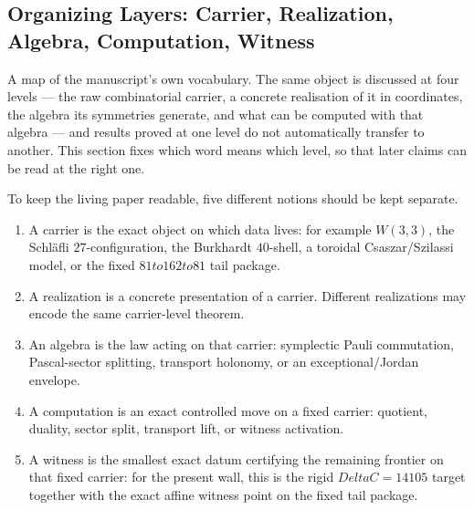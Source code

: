 \documentclass[12pt,a4paper]{article}
\def\textbf#1{#1}%
\def\Delta{Delta}%
\def\to{ to }%
\theoremstyle{definition}
\begin{document}
\subsection{Organizing Layers: Carrier, Realization, Algebra, Computation, Witness}

\begin{plainbox}
A map of the manuscript's own vocabulary. The same object is discussed at four
levels --- the raw combinatorial carrier, a concrete realisation of it in coordinates, the
algebra its symmetries generate, and what can be computed with that algebra --- and results
proved at one level do not automatically transfer to another. This section fixes which word
means which level, so that later claims can be read at the right one.
\end{plainbox}


To keep the living paper readable, five different notions should be kept
separate.
\begin{enumerate}[leftmargin=2em]
\item A \textbf{carrier} is the exact object on which data lives: for
example $W(3,3)$, the Schl\"afli $27$-configuration, the Burkhardt
$40$-shell, a toroidal Csaszar/Szilassi model, or the fixed
$81\to 162\to 81$ tail package.
\item A \textbf{realization} is a concrete presentation of a carrier.
Different realizations may encode the same carrier-level theorem.
\item An \textbf{algebra} is the law acting on that carrier: symplectic
Pauli commutation, Pascal-sector splitting, transport holonomy, or an
exceptional/Jordan envelope.
\item A \textbf{computation} is an exact controlled move on a fixed
carrier: quotient, duality, sector split, transport lift, or witness
activation.
\item A \textbf{witness} is the smallest exact datum certifying the
remaining frontier on that fixed carrier: for the present wall, this is
the rigid $\Delta C=14105$ target together with the exact affine witness
point on the fixed tail package.
\end{enumerate}
\end{document}
